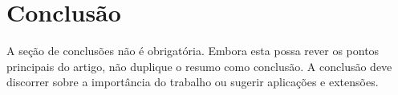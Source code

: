 \section{Conclusão}
A seção de conclusões não é obrigatória. Embora esta possa rever os pontos principais do artigo, não duplique o resumo como conclusão. A conclusão deve discorrer sobre a importância do trabalho ou sugerir aplicações e extensões.

\begin{comment}
Aqui também é um comentário
\end{comment}